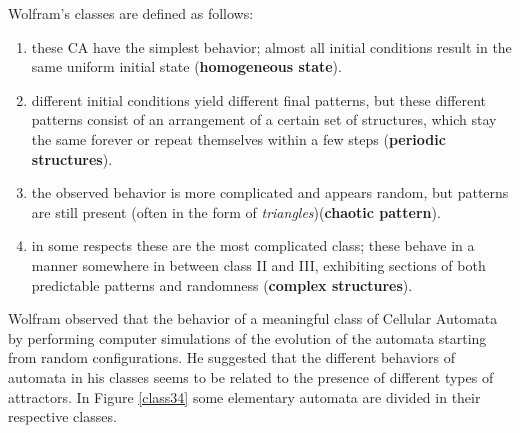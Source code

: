 Wolfram's classes are defined as follows:
\begin{enumerate}[I]
  \item these CA have the simplest behavior; almost all initial conditions
  result in the same uniform initial state (\textbf{homogeneous state}).
  \item different initial conditions yield different final patterns, but
  these different patterns consist of an arrangement of a certain set of
  structures, which stay the same forever or repeat themselves within a few
  steps (\textbf{periodic structures}).
  \item the observed behavior is more complicated and appears random, but
  patterns are still present (often in the form of \textit{triangles})(\textbf{chaotic pattern}).
  \item in some respects these are the most complicated class; these behave
  in a manner somewhere in between class II and III, exhibiting sections
   of both predictable patterns and randomness (\textbf{complex structures}).
\end{enumerate}
Wolfram  observed that the behavior of a meaningful class of Cellular Automata
by performing computer simulations of the evolution of the automata starting
from random configurations. He suggested that the different behaviors of
automata in his classes seems to be related to the presence of different types
of attractors.
In Figure \ref{class34} some elementary automata are divided in their respective classes.
